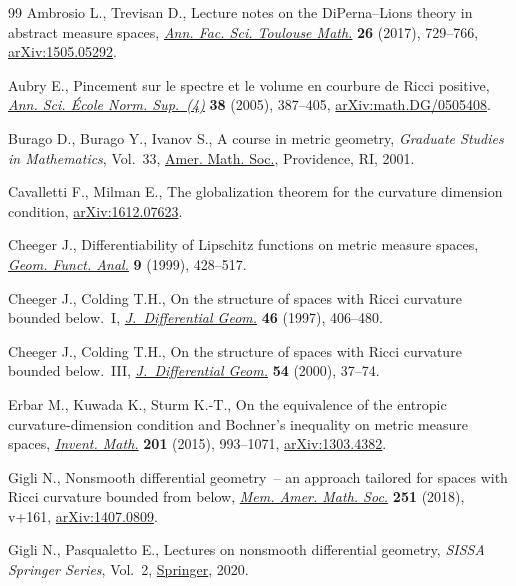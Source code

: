 \documentclass[10pt,a4paper]{amsart}
\numberwithin{equation}{section}
\theoremstyle{definition}
\begin{document}
\begin{thebibliography}{99}
Ambrosio L., Trevisan D., Lecture notes on the {D}i{P}erna--{L}ions theory in
 abstract measure spaces, \href{https://doi.org/10.5802/afst.1551}{\textit{Ann. Fac. Sci. Toulouse Math.}} \textbf{26}
 (2017), 729--766, \href{https://arxiv.org/abs/1505.05292}{arXiv:1505.05292}.

Aubry E., Pincement sur le spectre et le volume en courbure de {R}icci
 positive, \href{https://doi.org/10.1016/j.ansens.2005.01.002}{\textit{Ann. Sci. \'Ecole Norm. Sup.~(4)}} \textbf{38} (2005),
 387--405, \href{https://arxiv.org/abs/math.DG/0505408}{arXiv:math.DG/0505408}.

Burago D., Burago Y., Ivanov S., A course in metric geometry, \textit{Graduate
 Studies in Mathematics}, Vol.~33, \href{https://doi.org/10.1090/gsm/033}{Amer. Math. Soc.}, Providence, RI, 2001.

Cavalletti F., Milman E., The globalization theorem for the curvature dimension
 condition, \href{https://arxiv.org/abs/1612.07623}{arXiv:1612.07623}.

Cheeger J., Differentiability of {L}ipschitz functions on metric measure
 spaces, \href{https://doi.org/10.1007/s000390050094}{\textit{Geom. Funct. Anal.}} \textbf{9} (1999), 428--517.

Cheeger J., Colding T.H., On the structure of spaces with {R}icci curvature
 bounded below.~{I}, \href{https://doi.org/10.4310/jdg/1214459974}{\textit{J.~Differential Geom.}} \textbf{46} (1997),
 406--480.

Cheeger J., Colding T.H., On the structure of spaces with {R}icci curvature
 bounded below.~{III}, \href{https://doi.org/10.4310/jdg/1214342146}{\textit{J.~Differential Geom.}} \textbf{54} (2000),
 37--74.

Erbar M., Kuwada K., Sturm K.-T., On the equivalence of the entropic
 curvature-dimension condition and {B}ochner's inequality on metric measure
 spaces, \href{https://doi.org/10.1007/s00222-014-0563-7}{\textit{Invent. Math.}} \textbf{201} (2015), 993--1071,
 \href{https://arxiv.org/abs/1303.4382}{arXiv:1303.4382}.

Gigli N., Nonsmooth differential geometry~-- an approach tailored for spaces
 with {R}icci curvature bounded from below, \href{https://doi.org/10.1090/memo/1196}{\textit{Mem. Amer. Math. Soc.}}
 \textbf{251} (2018), v+161, \href{https://arxiv.org/abs/1407.0809}{arXiv:1407.0809}.

Gigli N., Pasqualetto E., Lectures on nonsmooth differential geometry,
 \textit{SISSA Springer Series}, Vol.~2, \href{https://doi.org/10.1007/978-3-030-38613-9}{Springer}, 2020.


\end{thebibliography}
\end{document}
